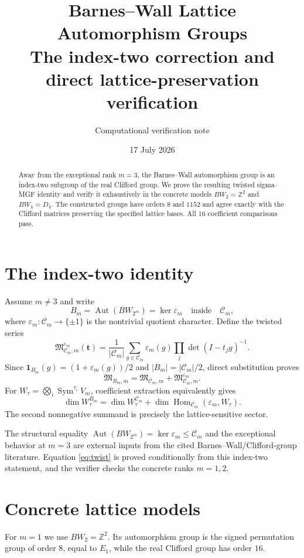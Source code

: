 \documentclass[11pt]{article}
\title{\color{navy}\bfseries Barnes--Wall Lattice Automorphism Groups\\
\large The index-two correction and direct lattice-preservation verification}
\author{Computational verification note}\date{17 July 2026}
\newcommand{\MGF}{\mathfrak M}
\begin{document}
\maketitle

\begin{abstract}
Away from the exceptional rank $m=3$, the Barnes--Wall automorphism group is
an index-two subgroup of the real Clifford group.  We prove the resulting
twisted sigma--MGF identity and verify it exhaustively in the concrete models
$BW_2=\mathbb Z^2$ and $BW_4=D_4$.  The constructed groups have orders $8$
and $1152$ and agree exactly with the Clifford matrices preserving the
specified lattice bases.  All 16 coefficient comparisons pass.
\end{abstract}

\section{The index-two identity}
Assume $m\ne3$ and write
\[
B_m=\operatorname{Aut}(BW_{2^m})=\ker\varepsilon_m
\quad\text{inside}\quad \mathcal C_m,
\]
where $\varepsilon_m:\mathcal C_m\to\{\pm1\}$ is the nontrivial quotient
character.  Define the twisted series
\[
\MGF^{\varepsilon_m}_{\mathcal C_m,m}(\mathbf t)
=\frac1{|\mathcal C_m|}\sum_{g\in\mathcal C_m}\varepsilon_m(g)
\prod_j\det(I-t_jg)^{-1}.
\]
Since $\mathbf1_{B_m}(g)=(1+\varepsilon_m(g))/2$ and
$|B_m|=|\mathcal C_m|/2$, direct substitution proves
\begin{equation}\label{eq:twist}
\boxed{\MGF_{B_m,m}=\MGF_{\mathcal C_m,m}
+\MGF^{\varepsilon_m}_{\mathcal C_m,m}.}
\end{equation}
For $W_\tau=\bigotimes_i\operatorname{Sym}^{\tau_i}V_m$, coefficient
extraction equivalently gives
\[
\dim W_\tau^{B_m}=\dim W_\tau^{\mathcal C_m}
+\dim\operatorname{Hom}_{\mathcal C_m}(\varepsilon_m,W_\tau).
\]
The second nonnegative summand is precisely the lattice-sensitive sector.

The structural equality
$\operatorname{Aut}(BW_{2^m})=\ker\varepsilon_m\leq\mathcal C_m$ and the
exceptional behavior at $m=3$ are external inputs from the cited
Barnes--Wall/Clifford-group literature.  Equation \eqref{eq:twist} is proved
conditionally from this index-two statement, and the verifier checks the
concrete ranks $m=1,2$.

\section{Concrete lattice models}
For $m=1$ we use $BW_2=\mathbb Z^2$.  Its automorphism group is the signed
permutation group of order $8$, equal to $E_1$, while the real Clifford group
has order $16$.
\end{document}
